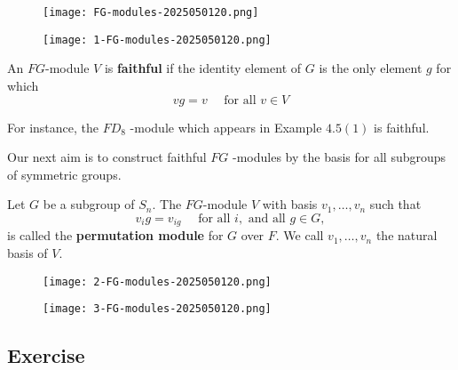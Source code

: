 \begin{figure}[H]
\centering
\texttt{[image: FG-modules-2025050120.png]}
\label{}
\end{figure}
\begin{figure}[H]
\centering
\texttt{[image: 1-FG-modules-2025050120.png]}
\label{}
\end{figure}

\begin{definition}[faithful]
An $FG$-module $V$ is \textbf{faithful} if the identity element of $G$ is the only element $g$ for which
\[
v g=v \quad \text { for all } v \in V
\]
\end{definition}
For instance, the $F D_8$ -module which appears in Example $4.5(1)$ is faithful.

Our next aim is to construct faithful $FG$ -modules by the basis for all subgroups of symmetric groups.

\begin{definition}
Let $G$ be a subgroup of $S_n$. The $F G$-module $V$ with basis $v_1, \ldots, v_n$ such that
\[
v_i g=v_{i g} \quad \text { for all } i, \text { and all } g \in G,
\]is called the \textbf{permutation module} for $G$ over $F$. We call $v_1, \ldots, v_n$ the natural basis of $V$.
\end{definition}
\begin{figure}[H]
\centering
\texttt{[image: 2-FG-modules-2025050120.png]}
\label{}
\end{figure}

\begin{figure}[H]
\centering
\texttt{[image: 3-FG-modules-2025050120.png]}
\label{}
\end{figure}

\subsection{Exercise}

